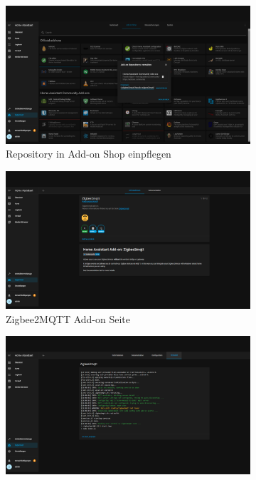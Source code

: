 \begin{figure}[H]
    \begin{subfigure}{.5\linewidth}
        \includegraphics[width=1\textwidth]{img/HA18.png}
        \caption{Repository in Add-on Shop einpflegen}
        \label{fig:ha14}
    \end{subfigure}
    \begin{subfigure}{.5\linewidth}
        \includegraphics[width=1\textwidth]{img/HA20.png}
        \caption{Zigbee2MQTT Add-on Seite}
        \label{fig:ha16}
    \end{subfigure}
    \begin{subfigure}{.5\linewidth}
        \includegraphics[width=1\textwidth]{img/HA22.png}

\end{subfigure}
\end{figure}
